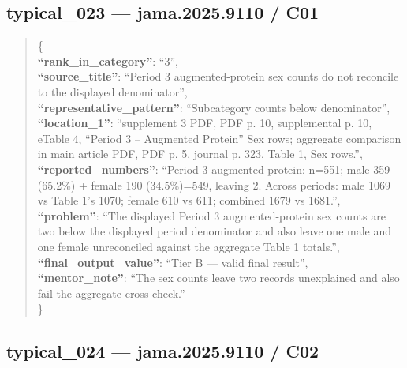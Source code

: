 \documentclass[
  letterpaper,
  9pt]{extreport}
\begin{document}
\hypertarget{typical_023--jama20259110--c01}{%
\subsection{typical\_023 --- jama.2025.9110 /
C01}\label{typical_023--jama20259110--c01}}

\begin{quote}
\{\\
\textbf{``rank\_in\_category''}: ``3'',\\
\textbf{``source\_title''}: ``Period 3 augmented-protein sex counts do
not reconcile to the displayed denominator'',\\
\textbf{``representative\_pattern''}: ``Subcategory counts below
denominator'',\\
\textbf{``location\_1''}: ``supplement 3 PDF, PDF p. 10, supplemental p.
10, eTable 4, ``Period 3 -- Augmented Protein'' Sex rows; aggregate
comparison in main article PDF, PDF p. 5, journal p. 323, Table 1, Sex
rows.'',\\
\textbf{``reported\_numbers''}: ``Period 3 augmented protein: n=551;
male 359 (65.2\%) + female 190 (34.5\%)=549, leaving 2. Across periods:
male 1069 vs Table 1's 1070; female 610 vs 611; combined 1679 vs
1681.'',\\
\textbf{``problem''}: ``The displayed Period 3 augmented-protein sex
counts are two below the displayed period denominator and also leave one
male and one female unreconciled against the aggregate Table 1
totals.'',\\
\textbf{``final\_output\_value''}: ``Tier B --- valid final result'',\\
\textbf{``mentor\_note''}: ``The sex counts leave two records
unexplained and also fail the aggregate cross-check.''\\
\}
\end{quote}

\hypertarget{typical_024--jama20259110--c02}{%
\subsection{typical\_024 --- jama.2025.9110 /
C02}\label{typical_024--jama20259110--c02}}
\end{document}
